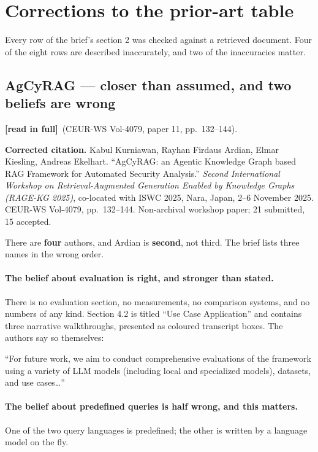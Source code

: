 \documentclass[11pt,a4paper]{article}
\newcommand{\readtag}{\textcolor{standing}{\textbf{[read in full]}}}
\begin{document}
\section{Corrections to the prior-art table}

Every row of the brief's section 2 was checked against a retrieved document. Four
of the eight rows are described inaccurately, and two of the inaccuracies matter.

\subsection{AgCyRAG --- closer than assumed, and two beliefs are wrong}

\readtag\ (CEUR-WS Vol-4079, paper 11, pp.~132--144).

\textbf{Corrected citation.} Kabul Kurniawan, Rayhan Firdaus Ardian, Elmar
Kiesling, Andreas Ekelhart. ``AgCyRAG: an Agentic Knowledge Graph based RAG
Framework for Automated Security Analysis.'' \emph{Second International Workshop
on Retrieval-Augmented Generation Enabled by Knowledge Graphs (RAGE-KG 2025)},
co-located with ISWC 2025, Nara, Japan, 2--6 November 2025. CEUR-WS Vol-4079,
pp.~132--144. Non-archival workshop paper; 21 submitted, 15 accepted.

There are \textbf{four} authors, and Ardian is \textbf{second}, not third. The
brief lists three names in the wrong order.

\paragraph{The belief about evaluation is right, and stronger than stated.}
There is no evaluation section, no measurements, no comparison systems, and no
numbers of any kind. Section 4.2 is titled ``Use Case Application'' and contains
three narrative walkthroughs, presented as coloured transcript boxes. The authors
say so themselves:

\begin{quotebox}
``For future work, we aim to conduct comprehensive evaluations of the framework
using a variety of LLM models (including local and specialized models), datasets,
and use cases\ldots''
\end{quotebox}

\paragraph{The belief about predefined queries is half wrong, and this matters.}
One of the two query languages is predefined; the other is written by a language
model on the fly.
\end{document}

